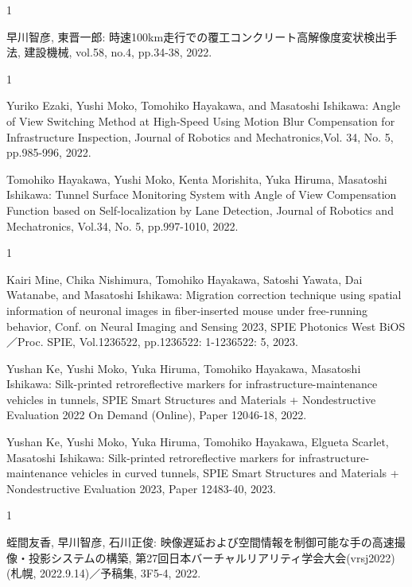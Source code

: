 \begin{招待論文}{1}

早川智彦, 東晋一郎: 時速100km走行での覆工コンクリート高解像度変状検出手法, 建設機械, vol.58, no.4, pp.34-38, 2022.

\end{招待論文}

\begin{雑誌論文}{1}

Yuriko Ezaki, Yushi Moko, Tomohiko Hayakawa, and Masatoshi Ishikawa: Angle of View Switching Method at High-Speed Using Motion Blur Compensation for Infrastructure Inspection, Journal of Robotics and Mechatronics,Vol. 34, No. 5, pp.985-996, 2022.

Tomohiko Hayakawa, Yushi Moko, Kenta Morishita, Yuka Hiruma, Masatoshi Ishikawa: Tunnel Surface Monitoring System with Angle of View Compensation Function based on Self-localization by Lane Detection, Journal of Robotics and Mechatronics, Vol.34, No. 5, pp.997-1010, 2022.

\end{雑誌論文}

\begin{査読付}{1}

Kairi Mine, Chika Nishimura, Tomohiko Hayakawa, Satoshi Yawata, Dai Watanabe, and Masatoshi Ishikawa: Migration correction technique using spatial information of neuronal images in fiber-inserted mouse under free-running behavior, Conf. on Neural Imaging and Sensing 2023, SPIE Photonics West BiOS／Proc. SPIE, Vol.1236522, pp.1236522: 1-1236522: 5, 2023.

Yushan Ke, Yushi Moko, Yuka Hiruma, Tomohiko Hayakawa, Masatoshi Ishikawa: Silk-printed retroreflective markers for infrastructure-maintenance vehicles in tunnels, SPIE Smart Structures and Materials + Nondestructive Evaluation 2022 On Demand (Online), Paper 12046-18, 2022.

Yushan Ke, Yushi Moko, Yuka Hiruma, Tomohiko Hayakawa, Elgueta Scarlet, Masatoshi Ishikawa: Silk-printed retroreflective markers for infrastructure-maintenance vehicles in curved tunnels, SPIE Smart Structures and Materials + Nondestructive Evaluation 2023, Paper 12483-40, 2023.

\end{査読付}

\begin{発表}{1}

蛭間友香, 早川智彦, 石川正俊: 映像遅延および空間情報を制御可能な手の高速撮像・投影システムの構築, 第27回日本バーチャルリアリティ学会大会(vrsj2022)(札幌, 2022.9.14)／予稿集, 3F5-4, 2022.

\end{発表}

